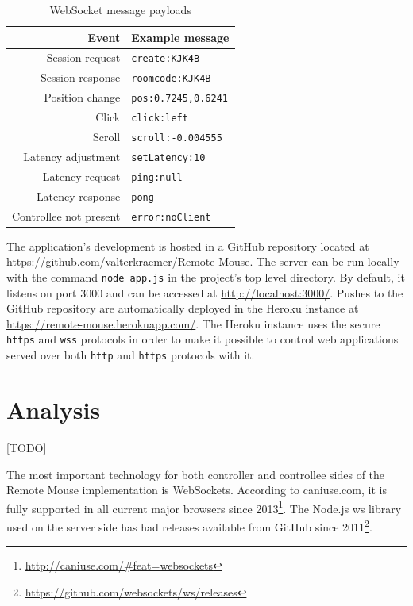 \documentclass[a4paper,english,twocolumn]{article}
\begin{document}
\begin{table} \centering
  \begin{tabular}{rl}
    Event & Example message \\
    \hline
    Session request & \verb!create:KJK4B! \\
    Session response & \verb!roomcode:KJK4B! \\
    Position change & \verb!pos:0.7245,0.6241! \\
    Click & \verb!click:left! \\
    Scroll & \verb!scroll:-0.004555! \\
    Latency adjustment & \verb!setLatency:10! \\
    Latency request & \verb!ping:null! \\
    Latency response & \verb!pong! \\
    Controllee not present & \verb!error:noClient! \\
    \hline
  \end{tabular}
  \caption{WebSocket message payloads}
  \label{table:messages}
\end{table}

The application's development is hosted in a GitHub repository located
at \url{https://github.com/valterkraemer/Remote-Mouse}. The server can
be run locally with the command \verb!node app.js! in the project's
top level directory. By default, it listens on port 3000 and can be
accessed at \url{http://localhost:3000/}. Pushes to the GitHub
repository are automatically deployed in the Heroku instance at
\url{https://remote-mouse.herokuapp.com/}. The Heroku instance uses
the secure \verb!https! and \verb!wss! protocols in order to make it
possible to control web applications served over both \verb!http! and
\verb!https! protocols with it.

\section{Analysis}

[TODO]

The most important technology for both controller and controllee sides
of the Remote Mouse implementation is WebSockets. According to
caniuse.com, it is fully supported in all current major browsers since
2013\footnote{\url{http://caniuse.com/#feat=websockets}}. The Node.js
ws library used on the server side has had releases available from
GitHub since
2011\footnote{\url{https://github.com/websockets/ws/releases}}.
\end{document}
